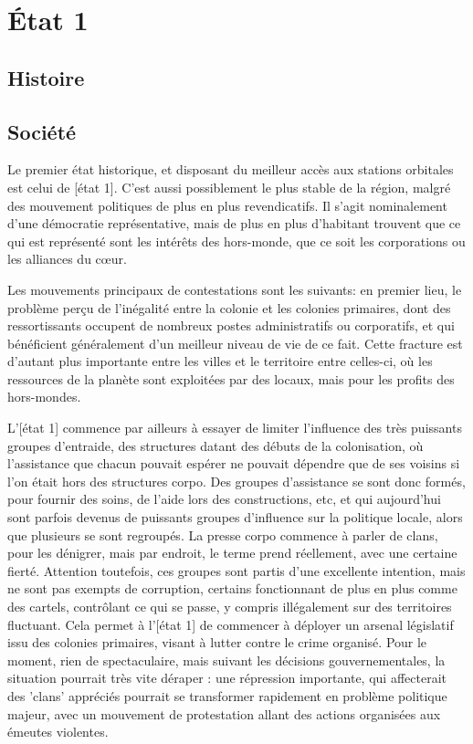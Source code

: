\documentclass[10pt,a4paper]{book}
\begin{document}
\chapter{État 1}
\begin{multicols}{2}
\section{Histoire}


\section{Société}
Le premier état historique, et disposant du meilleur accès aux stations orbitales est celui de [état 1]. C'est aussi possiblement le plus stable de la région, malgré des mouvement politiques de plus en plus revendicatifs. Il s'agit nominalement d'une démocratie représentative, mais de plus en plus d'habitant trouvent que ce qui est représenté sont les intérêts des hors-monde, que ce soit les corporations ou les alliances du cœur.

Les mouvements principaux de contestations sont les suivants: en premier lieu, le problème perçu de l'inégalité entre la colonie et les colonies primaires, dont des ressortissants occupent de nombreux postes administratifs ou corporatifs, et qui bénéficient généralement d'un meilleur niveau de vie de ce fait. Cette fracture est d'autant plus importante entre les villes et le territoire entre celles-ci, où les ressources de la planète sont exploitées par des locaux, mais pour les profits des hors-mondes. 

L'[état 1] commence par ailleurs à essayer de limiter l'influence des très puissants groupes d'entraide, des structures datant des débuts de la colonisation, où l'assistance que chacun pouvait espérer ne pouvait dépendre que de ses voisins si l'on était hors des structures corpo. Des groupes d'assistance se sont donc formés, pour fournir des soins, de l'aide lors des constructions, etc, et qui aujourd'hui sont parfois devenus de puissants groupes d'influence sur la politique locale, alors que plusieurs se sont regroupés. La presse corpo commence à parler de clans, pour les dénigrer, mais par endroit, le terme prend réellement, avec une certaine fierté. Attention toutefois, ces groupes sont partis d'une excellente intention, mais ne sont pas exempts de corruption, certains fonctionnant de plus en plus comme des cartels, contrôlant ce qui se passe, y compris illégalement sur des territoires fluctuant. Cela permet à l'[état 1] de commencer à déployer un arsenal législatif issu des colonies primaires, visant à lutter contre le crime organisé. Pour le moment, rien de spectaculaire, mais suivant les décisions gouvernementales, la situation pourrait très vite déraper : une répression importante, qui affecterait des 'clans' appréciés pourrait se transformer rapidement en problème politique majeur, avec un mouvement de protestation allant des actions organisées aux émeutes violentes.


\end{multicols}
\end{document}

